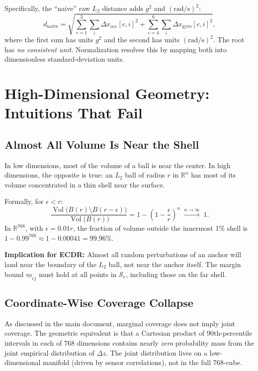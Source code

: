 \documentclass[11pt, a4paper]{article}
\theoremstyle{definition}
\theoremstyle{plain}
\newcommand{\R}{\mathbb{R}}
\newcommand{\Se}{\mathcal{S}_e}
\begin{document}
Specifically, the ``naive'' raw $L_2$ distance adds $g^2$ and $(\mathrm{rad/s})^2$:
\[
  d_{\text{naive}} = \sqrt{\sum_{c=1}^3 \sum_i \Delta x_{\text{acc}}[c,i]^2
                           + \sum_{c=4}^6 \sum_i \Delta x_{\text{gyro}}[c,i]^2},
\]
where the first sum has units $g^2$ and the second has units $(\mathrm{rad/s})^2$.
The root has \emph{no consistent unit}. Normalization resolves this by mapping both
into dimensionless standard-deviation units.

\section{High-Dimensional Geometry: Intuitions That Fail}

\subsection{Almost All Volume Is Near the Shell}

In low dimensions, most of the volume of a ball is near the center. In high
dimensions, the opposite is true: an $L_2$ ball of radius $r$ in $\R^n$ has most
of its volume concentrated in a thin shell near the surface.

Formally, for $\epsilon < r$:
\[
  \frac{\operatorname{Vol}\bigl(B(r) \setminus B(r - \epsilon)\bigr)}
       {\operatorname{Vol}\bigl(B(r)\bigr)}
  = 1 - \left(1 - \frac{\epsilon}{r}\right)^n \;\xrightarrow{n \to \infty}\; 1.
\]
In $\R^{768}$, with $\epsilon = 0.01r$, the fraction of volume outside the
innermost 1\% shell is $1 - 0.99^{768} \approx 1 - 0.00041 = 99.96\%$.

\textbf{Implication for ECDR:} Almost all random perturbations of an anchor will
land near the boundary of the $L_2$ ball, not near the anchor itself. The margin
bound $\underline{m}_{cj}$ must hold at all points in $\Se$, including those on
the far shell.

\subsection{Coordinate-Wise Coverage Collapse}

As discussed in the main document, marginal coverage does not imply joint coverage.
The geometric equivalent is that a Cartesian product of 90th-percentile intervals
in each of 768 dimensions contains nearly \emph{zero} probability mass from the
joint empirical distribution of $\Delta z$. The joint distribution lives on a
low-dimensional manifold (driven by sensor correlations), not in the full 768-cube.
\end{document}
